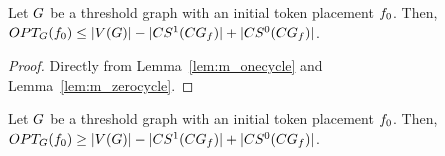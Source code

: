 \documentclass[msc,english,table,xcdraw]{ppgccufmg}
\begin{document}

\begin{lemma}
\label{lem:ub_threshold}
Let $G$ be a threshold graph with an initial token placement $f_{0}$.
Then, $OPT_{G}(f_{0}) \leq |V(G)| - 
|CS^{1}(CG_{f})| +
|CS^{0}(CG_{f})|$.
\end{lemma}

\begin{proof}
Directly from Lemma~\ref{lem:m_onecycle} and Lemma~\ref{lem:m_zerocycle}.
\end{proof}

\begin{lemma}
\label{lem:lb_threshold}
Let $G$ be a threshold graph with an initial token placement $f_{0}$.
Then, $OPT_{G}(f_{0}) \geq |V(G)| - 
|CS^{1}(CG_{f})| +
|CS^{0}(CG_{f})|$.
\end{lemma}
\end{document}
